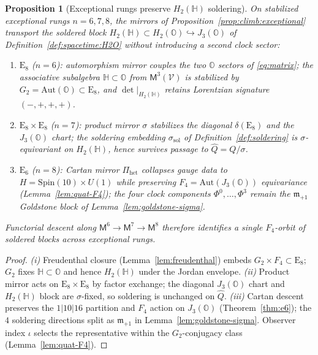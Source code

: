 \documentclass[aps,prd,onecolumn,amsmath,amssymb,nofootinbib,11pt]{revtex4-2}
\numberwithin{equation}{section}
\theoremstyle{plain}
\newtheorem{proposition}[theorem]{Proposition}
\theoremstyle{definition}
\theoremstyle{remark}
\newcommand{\Quat}{\mathbb{H}}
\newcommand{\Oct}{\mathbb{O}}
\newcommand{\jalg}{J_3(\mathbb{O})}
\newcommand{\E}[1]{\mathrm{E}_{#1}}
\newcommand{\Spin}{\mathrm{Spin}}
\newcommand{\Void}{\mathcal{V}}
\newcommand{\Mirror}{\mathsf{M}}
\newcommand{\orderparam}{\Phi}
\begin{document}
\begin{proposition}[Exceptional rungs preserve $H_2(\Quat)$ soldering]
\label{prop:soldering-transport}
On stabilized exceptional rungs $n=6,7,8$, the mirrors of
Proposition~\ref{prop:climb:exceptional} transport the soldered block
$H_2(\Quat)\subset H_2(\Oct)\hookrightarrow\jalg$ of
Definition~\ref{def:spacetime:H2O} without introducing a second clock sector:
\begin{enumerate}[label=(\roman*),leftmargin=*]
  \item $\E{8}$ ($n=6$): automorphism mirror couples the two $\Oct$ sectors of
    \eqref{eq:matrix}; the associative subalgebra $\Quat\subset\Oct$ from
    $\Mirror^3(\Void)$ is stabilized by $G_2=\mathrm{Aut}(\Oct)\subset\E{8}$,
    and $\det|_{H_2(\Quat)}$ retains Lorentzian signature $(-,+,+,+)$.
  \item $\E{8}\times\E{8}$ ($n=7$): product mirror $\sigma$ stabilizes the
    diagonal $\delta(\E{8})$ and the $\jalg$ chart; the soldering embedding
    $\sigma_{\mathrm{sol}}$ of Definition~\ref{def:soldering} is
    $\sigma$-equivariant on $H_2(\Quat)$, hence survives passage to
    $\hat Q=Q/\sigma$.
  \item $\E{6}$ ($n=8$): Cartan mirror $\Pi_{\mathrm{het}}$ collapses gauge data
    to $H=\Spin(10)\times U(1)$ while preserving $F_4=\mathrm{Aut}(\jalg)$
    equivariance (Lemma~\ref{lem:quat-F4}); the four clock components
    $\orderparam^0,\ldots,\orderparam^3$ remain the $\mathfrak{m}_{+1}$
    Goldstone block of Lemma~\ref{lem:goldstone-sigma}.
\end{enumerate}
Functorial descent along $\Mirror^6\to\Mirror^7\to\Mirror^8$ therefore
identifies a single $F_4$-orbit of soldered blocks across exceptional rungs.
\end{proposition}

\begin{proof}
\emph{(i)} Freudenthal closure (Lemma~\ref{lem:freudenthal}) embeds
$G_2\times F_4\subset\E{8}$; $G_2$ fixes $\Quat\subset\Oct$ and hence
$H_2(\Quat)$ under the Jordan envelope. \emph{(ii)} Product mirror acts on
$\E{8}\times\E{8}$ by factor exchange; the diagonal $\jalg$ chart and
$H_2(\Quat)$ block are $\sigma$-fixed, so soldering is unchanged on
$\hat Q$. \emph{(iii)} Cartan descent preserves the $1|10|16$ partition and
$F_4$ action on $\jalg$ (Theorem~\ref{thm:e6}); the $4$ soldering directions
split as $\mathfrak{m}_{+1}$ in Lemma~\ref{lem:goldstone-sigma}. Observer
index $\iota$ selects the representative within the $G_2$-conjugacy class
(Lemma~\ref{lem:quat-F4}).
\end{proof}
\end{document}
